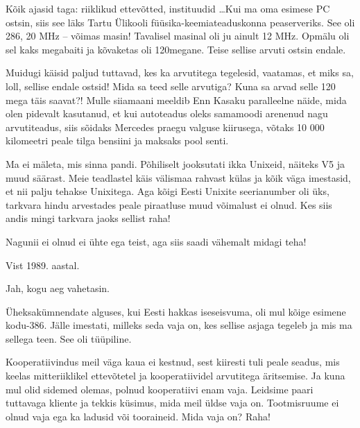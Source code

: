 
Kõik ajasid taga: riiklikud ettevõtted, instituudid \ldots Kui ma oma 
esimese PC ostsin, siis see läks Tartu Ülikooli 
füüsika-keemiateaduskonna peaserveriks. See oli 286, 20 MHz -- võimas masin! Tavalisel masinal oli ju ainult 12 MHz. Opmälu oli sel kaks 
megabaiti ja kõvaketas oli 120megane. Teise sellise arvuti ostsin 
endale. 

Muidugi käisid paljud tuttavad, kes ka arvutitega tegelesid, vaatamas, 
et miks sa, loll, sellise endale ostsid! Mida sa teed selle arvutiga? Kuna 
sa arvad selle 120 mega täis saavat?! Mulle siiamaani 
meeldib Enn Kasaku paralleelne näide, mida olen pidevalt kasutanud, et kui autoteadus oleks samamoodi arenenud nagu 
arvutiteadus, siis sõidaks Mercedes praegu valguse kiirusega, võtaks 10 000 
kilomeetri peale tilga bensiini ja maksaks pool senti.


Ma ei mäleta, mis sinna pandi. Põhiliselt jooksutati 
ikka Unixeid, näiteks V5 ja muud säärast. 
Meie teadlastel käis välismaa rahvast külas ja kõik väga imestasid, 
et nii palju tehakse Unixitega. Aga kõigi Eesti Unixite seerianumber oli üks, 
tarkvara hindu arvestades peale piraatluse muud võimalust ei olnud. Kes siis 
andis mingi tarkvara jaoks sellist raha!


Nagunii ei olnud ei ühte ega teist, aga siis saadi vähemalt midagi teha!


Vist 1989. aastal.


Jah, kogu aeg vahetasin. 

Üheksakümnendate alguses, kui Eesti hakkas iseseisvuma, oli mul kõige esimene 
kodu-386. Jälle imestati, milleks seda vaja on, kes sellise asjaga tegeleb ja mis 
ma sellega teen. See oli tüüpiline.


Kooperatiivindus meil väga kaua ei kestnud, sest kiiresti 
tuli peale seadus, mis keelas mitteriiklikel ettevõtetel ja 
kooperatiividel arvutitega äritsemise. Ja kuna mul olid sidemed olemas, polnud 
kooperatiivi enam vaja. Leidsime paari tuttavaga kliente ja 
tekkis küsimus, mida meil üldse vaja on. Tootmisruume 
ei olnud vaja ega ka ladusid või tooraineid. Mida 
vaja on? Raha!

